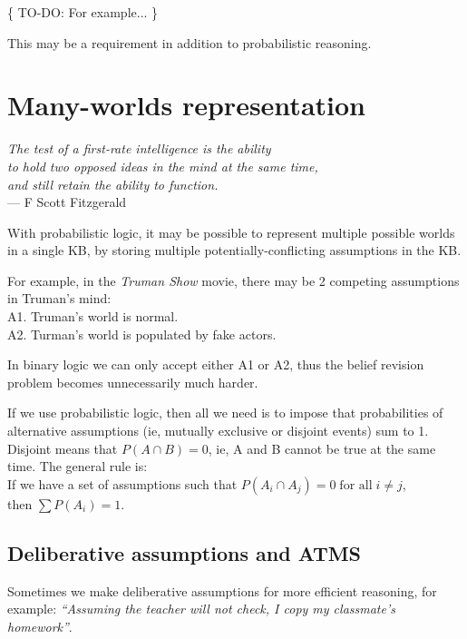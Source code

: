 \{ TO-DO:  For example... \}

This may be a requirement in addition to probabilistic reasoning.

\section{Many-worlds representation}

\begin{flushright}
\emph{The test of a first-rate intelligence is the ability\\
to hold two opposed ideas in the mind at the same time,\\
and still retain the ability to function.}\\
--- F Scott Fitzgerald
\end{flushright}

With probabilistic logic, it may be possible to represent multiple possible worlds in a single KB, by storing multiple potentially-conflicting assumptions in the KB.

For example, in the \textit{Truman Show} movie, there may be 2 competing assumptions in Truman's mind:\\
\hspace*{1cm} A1.  Truman's world is normal.\\
\hspace*{1cm} A2.  Turman's world is populated by fake actors.

In binary logic we can only accept either A1 or A2, thus the belief revision problem becomes unnecessarily much harder.

If we use probabilistic logic, then all we need is to impose that probabilities of alternative assumptions (ie, mutually exclusive or disjoint events) sum to 1.  Disjoint means that $P(A \cap B) = 0$, ie, A and B cannot be true at the same time.  The general rule is:\\
\hspace*{1cm} If we have a set of assumptions such that $P(A_i \cap A_j) = 0 \; \mbox{for all} \; i \neq j$,\\
\hspace*{1cm} then $\sum P(A_i) = 1$.

\subsection{Deliberative assumptions and ATMS}

Sometimes we make deliberative assumptions for more efficient reasoning, for example:  \textit{``Assuming the teacher will not check, I copy my classmate's homework''}.

